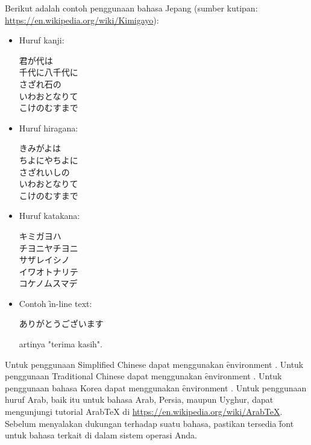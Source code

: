 Berikut adalah contoh penggunaan bahasa Jepang (sumber kutipan: \url{https://en.wikipedia.org/wiki/Kimigayo}):
\begin{itemize}
	\item Huruf kanji:\\
	\begin{japanese}
		君が代は\\
		千代に八千代に\\
		さざれ石の\\
		いわおとなりて\\
		こけのむすまで
	\end{japanese}
	\item Huruf hiragana:\\
	\begin{japanese}
		きみがよは\\
		ちよにやちよに\\
		さざれいしの\\
		いわおとなりて\\
		こけのむすまで
	\end{japanese}
	\item Huruf katakana:\\
	\begin{japanese}
		キミガヨハ\\
		チヨニヤチヨニ\\
		サザレイシノ\\
		イワオトナリテ\\
		コケノムスマデ
	\end{japanese}
	\item Contoh \f{in-line text}: \begin{japanese}ありがとうございます\end{japanese} artinya "terima kasih".
\end{itemize}

Untuk penggunaan Simplified Chinese dapat menggunakan \f{environment} . Untuk penggunaan Traditional Chinese dapat menggunakan \f{environment} . Untuk penggunaan bahasa Korea dapat menggunakan \f{environment} . Untuk penggunaan huruf Arab, baik itu untuk bahasa Arab, Persia, maupun Uyghur, dapat mengunjungi tutorial ArabTeX di \url{https://en.wikipedia.org/wiki/ArabTeX}. Sebelum menyalakan dukungan terhadap suatu bahasa, pastikan tersedia \f{font} untuk bahasa terkait di dalam sistem operasi Anda.